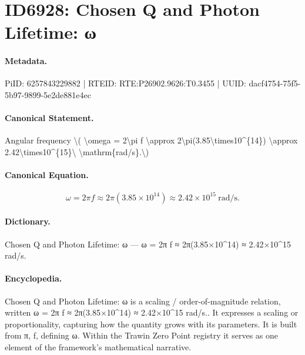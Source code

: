 \section*{ID6928: Chosen Q and Photon Lifetime: ω}
\paragraph{Metadata.}
PiID: 6257843229882 | RTEID: RTE:P26902.9626:T0.3455 | UUID: dacf4754-75f5-5b97-9899-5e2de881e4ec

\paragraph{Canonical Statement.}
Angular frequency \textbackslash{}( \textbackslash{}omega = 2\textbackslash{}pi f \textbackslash{}approx 2\textbackslash{}pi(3.85\textbackslash{}times10\textasciicircum{}\{14\}) \textbackslash{}approx 2.42\textbackslash{}times10\textasciicircum{}\{15\}\textbackslash{} \textbackslash{}mathrm\{rad/s\}.\textbackslash{})

\paragraph{Canonical Equation.}
\[
\omega = 2\pi f \approx 2\pi(3.85\times10^{14}) \approx 2.42\times10^{15}\ \mathrm{rad/s}.
\]

\paragraph{Dictionary.}
Chosen Q and Photon Lifetime: ω — ω = 2π f ≈ 2π(3.85×10\textasciicircum{}14) ≈ 2.42×10\textasciicircum{}15 rad/s.

\paragraph{Encyclopedia.}
Chosen Q and Photon Lifetime: ω is a scaling / order-of-magnitude relation, written ω = 2π f ≈ 2π(3.85×10\textasciicircum{}14) ≈ 2.42×10\textasciicircum{}15 rad/s.. It expresses a scaling or proportionality, capturing how the quantity grows with its parameters. It is built from π, f, defining ω. Within the Trawin Zero Point registry it serves as one element of the framework's mathematical narrative.

